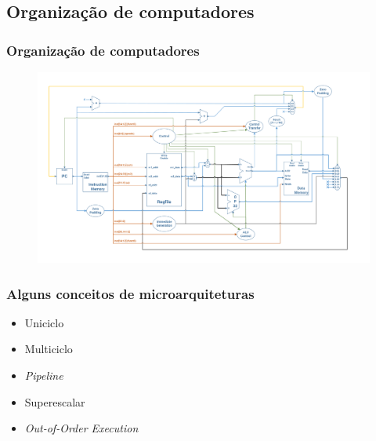 \documentclass[aspectratio=169]{beamer}
\begin{document}
    \subsection{Organização de computadores}
    \begin{frame}
        \frametitle{Organização de computadores}
        \vfill
        \begin{figure}[H]
        \centering
            \includegraphics[width=.9\textwidth,height=.9\textheight,keepaspectratio]
            {../images/singlecycle_generic.png}
        \end{figure}
        \vfill
    \end{frame}

    \begin{frame}
        \frametitle{Alguns conceitos de microarquiteturas}
        \vfill
        \begin{itemize}
            \item Uniciclo
            \item Multiciclo
            \item \textit{Pipeline}
            \item Superescalar
            \item \textit{Out-of-Order Execution}
        \end{itemize}
        \vfill
    \end{frame}
\end{document}
